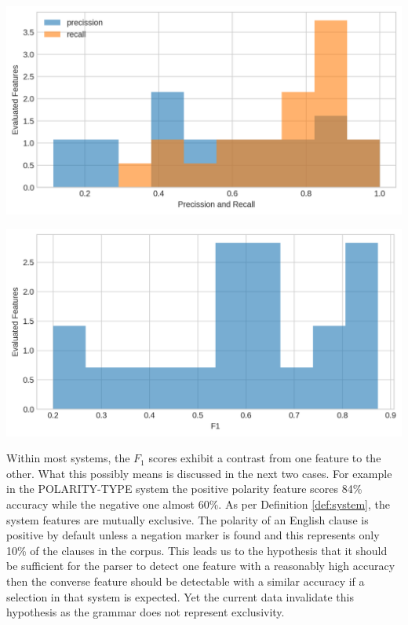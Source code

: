     \vspace{1em}
    \noindent
    \begin{minipage}[b]{0.49\textwidth}
        \centering
        \includegraphics[width=\textwidth]{evaluation-results/figures-old/accuracy-syntactic-mood-precission-recall.png}
        \label{fig:mood-precission-recall}
    \end{minipage}
    \quad
    \begin{minipage}[b]{0.49\textwidth}
        \centering
        \includegraphics[width=\textwidth]{evaluation-results/figures-old/accuracy-syntactic-mood-f1.png}
        \label{fig:mood-precission-f1}
    \end{minipage}
    \vspace{.5em}
    
    Within most systems, the $F_1$ scores exhibit a contrast from one feature to the other. What this possibly means is discussed in the next two cases. For example in the POLARITY-TYPE system the positive polarity feature scores 84\% accuracy while the negative one almost 60\%. As per Definition \ref{def:system}, the system features are mutually exclusive. The polarity of an English clause is positive by default unless a negation marker is found and this represents only 10\% of the clauses in  the corpus. This leads us to the hypothesis that it should be sufficient for the parser to detect one feature with a reasonably high accuracy then the converse feature should be detectable with a similar accuracy if a selection in that system is expected. Yet the current data invalidate this hypothesis as the grammar does not represent exclusivity.
    
